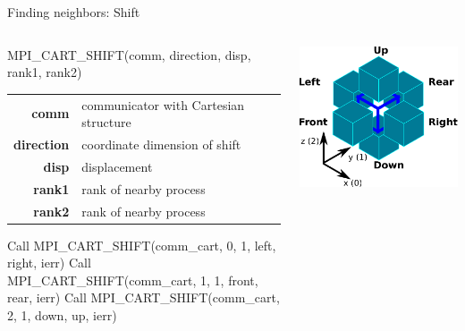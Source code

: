 \documentclass[aspectratio=43]{beamer}
\begin{document}
\begin{frame}[fragile]{Finding neighbors: Shift}
\begin{columns}
\begin{column}{0.65\paperwidth}
\begin{Fortranlisting}[]{}
MPI_CART_SHIFT(comm, direction, disp, rank1, rank2)
\end{Fortranlisting}
\begin{black1block}{}
\begin{tabular}{rp{8cm}}
\textbf{comm} & communicator with Cartesian structure\\
\textbf{direction} & coordinate dimension of shift\\
\textbf{disp} & displacement\\
\textbf{rank1} & rank of nearby process\\
\textbf{rank2} & rank of nearby process\\
\end{tabular}
\end{black1block}
\begin{Fortranlisting}[]{}
Call MPI_CART_SHIFT(comm_cart, 0, 1, left, right, ierr)
Call MPI_CART_SHIFT(comm_cart, 1, 1, front, rear, ierr)
Call MPI_CART_SHIFT(comm_cart, 2, 1, down, up, ierr)
\end{Fortranlisting}

\end{column}
\begin{column}{0.3\paperwidth}
\vspace{4cm}
\includegraphics[scale=0.36]{05.MPI_Topo/shift.pdf}
\end{column}
\end{columns}

\end{frame}
\end{document}
